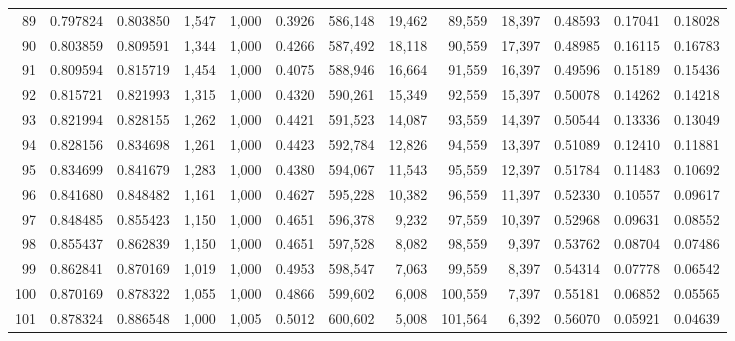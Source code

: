 \begin{tabular}{rrrrrrrrrrrrr}
89  &  0.797824 &  0.803850 &   1,547 &  1,000 &                                     0.3926 &  586,148 &   19,462 &   89,559 &   18,397 &  0.48593 &  0.17041 &  0.18028 \\
90  &  0.803859 &  0.809591 &   1,344 &  1,000 &                                     0.4266 &  587,492 &   18,118 &   90,559 &   17,397 &  0.48985 &  0.16115 &  0.16783 \\
91  &  0.809594 &  0.815719 &   1,454 &  1,000 &                                     0.4075 &  588,946 &   16,664 &   91,559 &   16,397 &  0.49596 &  0.15189 &  0.15436 \\
92  &  0.815721 &  0.821993 &   1,315 &  1,000 &                                     0.4320 &  590,261 &   15,349 &   92,559 &   15,397 &  0.50078 &  0.14262 &  0.14218 \\
93  &  0.821994 &  0.828155 &   1,262 &  1,000 &                                     0.4421 &  591,523 &   14,087 &   93,559 &   14,397 &  0.50544 &  0.13336 &  0.13049 \\
94  &  0.828156 &  0.834698 &   1,261 &  1,000 &                                     0.4423 &  592,784 &   12,826 &   94,559 &   13,397 &  0.51089 &  0.12410 &  0.11881 \\
95  &  0.834699 &  0.841679 &   1,283 &  1,000 &                                     0.4380 &  594,067 &   11,543 &   95,559 &   12,397 &  0.51784 &  0.11483 &  0.10692 \\
96  &  0.841680 &  0.848482 &   1,161 &  1,000 &                                     0.4627 &  595,228 &   10,382 &   96,559 &   11,397 &  0.52330 &  0.10557 &  0.09617 \\
97  &  0.848485 &  0.855423 &   1,150 &  1,000 &                                     0.4651 &  596,378 &    9,232 &   97,559 &   10,397 &  0.52968 &  0.09631 &  0.08552 \\
98  &  0.855437 &  0.862839 &   1,150 &  1,000 &                                     0.4651 &  597,528 &    8,082 &   98,559 &    9,397 &  0.53762 &  0.08704 &  0.07486 \\
99  &  0.862841 &  0.870169 &   1,019 &  1,000 &                                     0.4953 &  598,547 &    7,063 &   99,559 &    8,397 &  0.54314 &  0.07778 &  0.06542 \\
100 &  0.870169 &  0.878322 &   1,055 &  1,000 &                                     0.4866 &  599,602 &    6,008 &  100,559 &    7,397 &  0.55181 &  0.06852 &  0.05565 \\
101 &  0.878324 &  0.886548 &   1,000 &  1,005 &                                     0.5012 &  600,602 &    5,008 &  101,564 &    6,392 &  0.56070 &  0.05921 &  0.04639 \\

\end{tabular}
